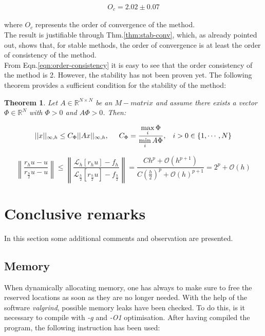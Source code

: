 \documentclass[11pt]{article}
\theoremstyle{theorem}
\newtheorem{theorem}{Theorem}
\theoremstyle{definition}
\begin{document}
\begin{align}
	\label{eqn:order-of-convergence}
	O_c = 2.02 \pm 0.07
\end{align} 

where $O_c$ represents the order of convergence of the method.\\
The result is justifiable through Thm.\ref{thm:stab-conv}, which, as already pointed out, shows that, for stable methods, the order of convergence is at least the order of consistency of the method.\\
From Eqn.\eqref{eqn:order-consistency} it is easy to see that the order consistency of the method is 2. However, the stability has not been proven yet. The following theorem provides a sufficient condition for the stability of the method:

\begin{theorem}
	\label{thm:stability-thm}
	Let $A\in\mathbb{R}^{N\times N}$ be an $M-matrix$ and assume there exists a vector $\Phi\in\mathbb{R}^{N}$ with $\Phi>0$ and $A\Phi >0$. Then:
	
	$$||x||_{\infty, h}\le C_\Phi||Ax||_{\infty, h}, \hspace{5mm}C_\Phi=\frac{\max\limits_{i}\Phi}{\min\limits_{i} A\Phi},\hspace{3mm} i>0\in\lbrace 1,\cdots, N\rbrace$$
\end{theorem}



$$\left\|\frac{r_hu-u}{r_{\frac{h}{2}}u-u}\right\|\le\left\|\frac{\mathcal{L}_h[r_hu]-f_h}{\mathcal{L}_{\frac{h}{2}}\left[r_\frac{h}{2}u\right]-f_\frac{h}{2}}\right\|=\frac{Ch^p+\mathcal{O}(h^{p+1})}{C\left(\frac{h}{2}\right)^p+\mathcal{O}(h)^{p+1}}= 2^p+\mathcal{O}(h)$$










\section{Conclusive remarks}
In this section some additional comments and observation are presented.

\subsection{Memory}
When dynamically allocating memory, one has always to make sure to free the reserved locations as soon as they are no longer needed. With the help of the software \emph{valgrind}, possible memory leaks have been checked. To do this, is it necessary to compile with \emph{-g} and \emph{-O1} optimisation. After having compiled the program, the following instruction has been used:
\end{document}
